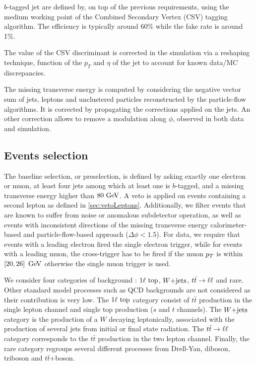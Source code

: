        $b$-tagged jet are defined by, on top of the previous requirements, using the medium working point of the 
       Combined Secondary Vertex (CSV) tagging algorithm. The efficiency is typically around 60\% while the fake rate is
       around 1\%.

       The value of the CSV discriminant is corrected in the simulation via a reshaping technique, function of the 
       $p_T$ and $\eta$ of the jet to account for known data/MC discrepancies.

       The missing transverse energy is computed by considering the negative vector sum of jets, leptons and 
       unclustered particles reconstructed by the particle-flow algorithms. It is corrected by propagating the 
       corrections applied on the jets. An other correction allows to remove a modulation along $\phi$, observed 
       in both data and simulation.

        \subsection{Events selection}

        The baseline selection, or preselection, is defined by asking exactly one electron or muon, at least 
        four jets among which at least one is $b$-tagged, and a missing transverse energy higher than $80 ~\text{GeV}$.
        A veto is applied on events containing a second lepton as defined in \ref{sec:vetoLeptons}. Additionally,
        we filter events that are known to suffer from noise or anomalous subdetector operation, as well as events
        with inconsistent directions of the missing transverse energy calorimeter-based and particle-flow-based
        approach ($\Delta \phi < 1.5$). For data, we require that events with a leading electron fired the single
        electron trigger, while for events with a leading muon, the cross-trigger has to be fired if the muon $p_T$
        is within $\left[ 20, 26 \right] ~\text{GeV}$ otherwise the single muon trigger is used.

        We consider four categories of background : $1\ell~\text{top}$, $\text{$W$+jets}$, $t\bar{t} \rightarrow \ell \ell$ and rare. Other standard
        model processes such as QCD backgrounds are not considered as their contribution is very low. The $1\ell~\text{top}$
        category consist of $t\bar{t}$ production in the single lepton channel and single top production ($s$ and $t$ channels).
        The $\text{$W$+jets}$ category is the production of a $W$ decaying leptonically, associated with the production of several
        jets from initial or final state radiation. The $t\bar{t} \rightarrow \ell \ell$ category corresponds to the $t\bar{t}$ production
        in the two lepton channel. Finally, the rare category regroups several different processes from Drell-Yan, diboson,
        triboson and $t\bar{t}$+boson.

